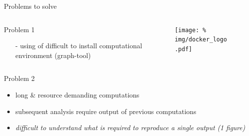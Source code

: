\begin{frame}{Problems to solve}

  \vspace{-0.5cm}
  
  \begin{columns}
    \begin{column}{.6\textwidth}
      \minipage[c][0.2\textheight][s]{\columnwidth}

      \vfill
      
      Problem 1 

      \begin{itemize}[leftmargin=0.6cm]
        
      \item[-] using of difficult to install computational environment (graph-tool)       
        
      \end{itemize}

      \vfill
      
      
      \endminipage      
    \end{column}
    \begin{column}{.4\textwidth}



      \begin{figure}
        \centering
        \texttt{[image: \%
          img/docker\_logo.pdf]} %
      \end{figure}
     
    \end{column}
  \end{columns}


  \vspace{-0.3cm}
  \begin{columns}
    \begin{column}{.6\textwidth}
      \minipage[c][0.5\textheight][s]{\columnwidth}

      \vfill
      
      Problem 2 

      \begin{itemize}[leftmargin=0.6cm]
        
      \item<1->[-] long \& resource demanding computations
      \item<1->[-] subsequent analysis require output of previous computations \vspace{0.17cm}
      \item<1->[] \textit{difficult to understand what is required to reproduce a single output (1 figure)}
        

\end{itemize}
\end{column}
\end{columns}
\end{frame}
